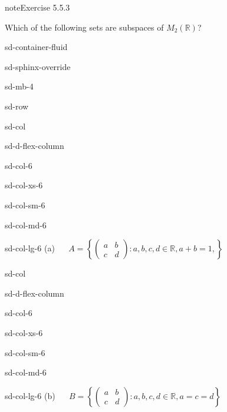 \documentclass[letterpaper,10pt,english]{jupyterBook}
\begin{document}
 \label{exercise:vector-spaces-ex-M2-subspaces}

\begin{sphinxadmonition}{note}{Exercise 5.5.3}



\sphinxAtStartPar
Which of the following sets are subspaces of \(M_2(\mathbb{R})\)?

\begin{sphinxuseclass}{sd-container-fluid}
\begin{sphinxuseclass}{sd-sphinx-override}
\begin{sphinxuseclass}{sd-mb-4}
\begin{sphinxuseclass}{sd-row}
\begin{sphinxuseclass}{sd-col}
\begin{sphinxuseclass}{sd-d-flex-column}
\begin{sphinxuseclass}{sd-col-6}
\begin{sphinxuseclass}{sd-col-xs-6}
\begin{sphinxuseclass}{sd-col-sm-6}
\begin{sphinxuseclass}{sd-col-md-6}
\begin{sphinxuseclass}{sd-col-lg-6}
\sphinxAtStartPar
(a)   \(A = \left\{ \begin{pmatrix} a & b \\ c & d \end{pmatrix} : a, b, c, d \in \mathbb{R}, a + b = 1,  \right\}\)

\end{sphinxuseclass}
\end{sphinxuseclass}
\end{sphinxuseclass}
\end{sphinxuseclass}
\end{sphinxuseclass}
\end{sphinxuseclass}
\end{sphinxuseclass}
\begin{sphinxuseclass}{sd-col}
\begin{sphinxuseclass}{sd-d-flex-column}
\begin{sphinxuseclass}{sd-col-6}
\begin{sphinxuseclass}{sd-col-xs-6}
\begin{sphinxuseclass}{sd-col-sm-6}
\begin{sphinxuseclass}{sd-col-md-6}
\begin{sphinxuseclass}{sd-col-lg-6}
\sphinxAtStartPar
(b)   \(B = \left\{ \begin{pmatrix} a & b \\ c & d \end{pmatrix}: a, b, c, d \in \mathbb{R}, a = c = d \right\}\)


\end{sphinxuseclass}
\end{sphinxuseclass}
\end{sphinxuseclass}
\end{sphinxuseclass}
\end{sphinxuseclass}
\end{sphinxuseclass}
\end{sphinxuseclass}
\end{sphinxuseclass}
\end{sphinxuseclass}
\end{sphinxuseclass}
\end{sphinxuseclass}
\end{sphinxadmonition}
\end{document}

